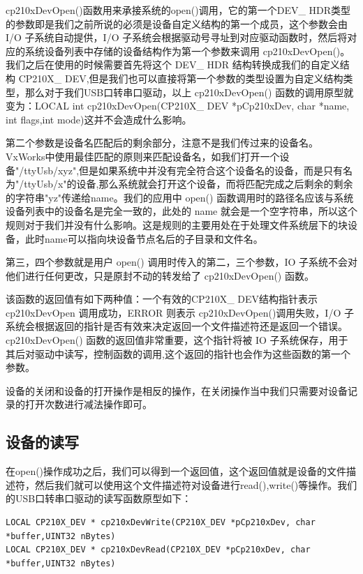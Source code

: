 	cp210xDevOpen()函数用来承接系统的open()调用，它的第一个DEV\_ HDR类型的参数即是我们之前所说的必须是设备自定义结构的第一个成员，这个参数会由 I/O 子系统自动提供，I/O 子系统会根据驱动号寻址到对应驱动函数时，然后将对应的系统设备列表中存储的设备结构作为第一个参数来调用 cp210xDevOpen()。我们之后在使用的时候需要首先将这个 DEV\_ HDR 结构转换成我们的自定义结构 CP210X\_ DEV,但是我们也可以直接将第一个参数的类型设置为自定义结构类型，那么对于我们USB口转串口驱动，以上  cp210xDevOpen() 函数的调用原型就变为：LOCAL int cp210xDevOpen(CP210X\_ DEV *pCp210xDev, char *name, int flags,int mode)这并不会造成什么影响。
		
	第二个参数是设备名匹配后的剩余部分，注意不是我们传过来的设备名。VxWorks中使用最佳匹配的原则来匹配设备名，如我们打开一个设备"/ttyUsb/xyz",但是如果系统中并没有完全符合这个设备名的设备，而是只有名为"/ttyUsb/x"的设备,那么系统就会打开这个设备，而将匹配完成之后剩余的剩余的字符串"yz"传递给name。我们的应用中 open() 函数调用时的路径名应该与系统设备列表中的设备名是完全一致的，此处的 name 就会是一个空字符串，所以这个规则对于我们并没有什么影响。这是规则的主要用处在于处理文件系统层下的块设备，此时name可以指向块设备节点名后的子目录和文件名。

	第三，四个参数就是用户 open() 调用时传入的第二，三个参数，IO 子系统不会对他们进行任何更改，只是原封不动的转发给了 cp210xDevOpen() 函数。
	
	该函数的返回值有如下两种值：一个有效的CP210X\_ DEV结构指针表示 cp210xDevOpen 调用成功，ERROR 则表示 cp210xDevOpen()调用失败，I/O 子系统会根据返回的指针是否有效来决定返回一个文件描述符还是返回一个错误。cp210xDevOpen() 函数的返回值非常重要，这个指针将被 IO 子系统保存，用于其后对驱动中读写，控制函数的调用,这个返回的指针也会作为这些函数的第一个参数。
	
	设备的关闭和设备的打开操作是相反的操作，在关闭操作当中我们只需要对设备记录的打开次数进行减法操作即可。

\subsection{设备的读写}\label{sec:设备的读写}
	在open()操作成功之后，我们可以得到一个返回值，这个返回值就是设备的文件描述符，然后我们就可以使用这个文件描述符对设备进行read(),write()等操作。我们的USB口转串口驱动的读写函数原型如下：

\lstset{language=C}
\begin{lstlisting}
LOCAL CP210X_DEV * cp210xDevWrite(CP210X_DEV *pCp210xDev, char *buffer,UINT32 nBytes)
LOCAL CP210X_DEV * cp210xDevRead(CP210X_DEV *pCp210xDev, char *buffer,UINT32 nBytes)
\end{lstlisting}

